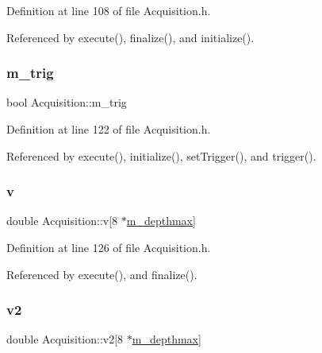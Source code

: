 Definition at line 108 of file Acquisition.\+h.



Referenced by execute(), finalize(), and initialize().

\mbox{\label{classAcquisition_a953bdc1bf56206b6df33b648af32a24f}} 
\subsubsection{\texorpdfstring{m\+\_\+trig}{m\_trig}}
{\footnotesize\ttfamily bool Acquisition\+::m\+\_\+trig\hspace{0.3cm}{\ttfamily [private]}}



Definition at line 122 of file Acquisition.\+h.



Referenced by execute(), initialize(), set\+Trigger(), and trigger().

\mbox{\label{classAcquisition_a8f0ef9898c1e63fb6f13c14508d3180d}} 
\subsubsection{\texorpdfstring{v}{v}}
{\footnotesize\ttfamily double Acquisition\+::v\mbox{[}8 $\ast$\hyperlink{classAcquisition_a7d95ba9a5593451a73754ed44f6bcd1c}{m\+\_\+depthmax}\mbox{]}\hspace{0.3cm}{\ttfamily [private]}}



Definition at line 126 of file Acquisition.\+h.



Referenced by execute(), and finalize().

\mbox{\label{classAcquisition_a841316dcf4f210ad52b144b187f2b7b6}} 
\subsubsection{\texorpdfstring{v2}{v2}}
{\footnotesize\ttfamily double Acquisition\+::v2\mbox{[}8 $\ast$\hyperlink{classAcquisition_a7d95ba9a5593451a73754ed44f6bcd1c}{m\+\_\+depthmax}\mbox{]}\hspace{0.3cm}{\ttfamily [private]}}



